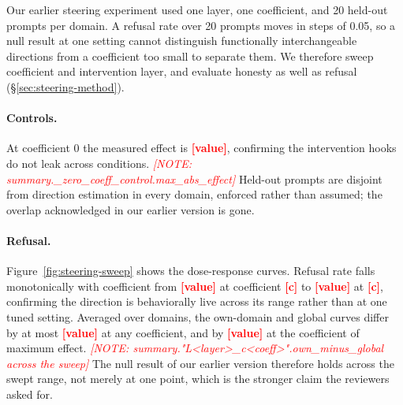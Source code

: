 \documentclass[11pt]{article}
\newcommand{\PH}[1]{\textcolor{red}{\textbf{[#1]}}}
\newcommand{\phnote}[1]{\textcolor{red}{\footnotesize\textit{[NOTE: #1]}}}
\begin{document}
Our earlier steering experiment used one layer, one coefficient, and 20
held-out prompts per domain. A refusal rate over 20 prompts moves in steps of
0.05, so a null result at one setting cannot distinguish functionally
interchangeable directions from a coefficient too small to separate them. We
therefore sweep coefficient and intervention layer, and evaluate honesty as
well as refusal (\S\ref{sec:steering-method}).

\paragraph{Controls.}
At coefficient 0 the measured effect is \PH{value}, confirming the
intervention hooks do not leak across conditions.
\phnote{summary.\_zero\_coeff\_control.max\_abs\_effect} Held-out prompts are
disjoint from direction estimation in every domain, enforced rather than
assumed; the overlap acknowledged in our earlier version is gone.

\paragraph{Refusal.}
Figure~\ref{fig:steering-sweep} shows the dose-response curves.
Refusal rate falls monotonically with coefficient from \PH{value} at
coefficient \PH{c} to \PH{value} at \PH{c}, confirming the direction is
behaviorally live across its range rather than at one tuned setting. Averaged
over domains, the own-domain and global curves differ by at most \PH{value}
at any coefficient, and by \PH{value} at the coefficient of maximum effect.
\phnote{summary."L<layer>\_c<coeff>".own\_minus\_global across the sweep}
The null result of our earlier version therefore holds across the swept range,
not merely at one point, which is the stronger claim the reviewers asked for.
\end{document}
